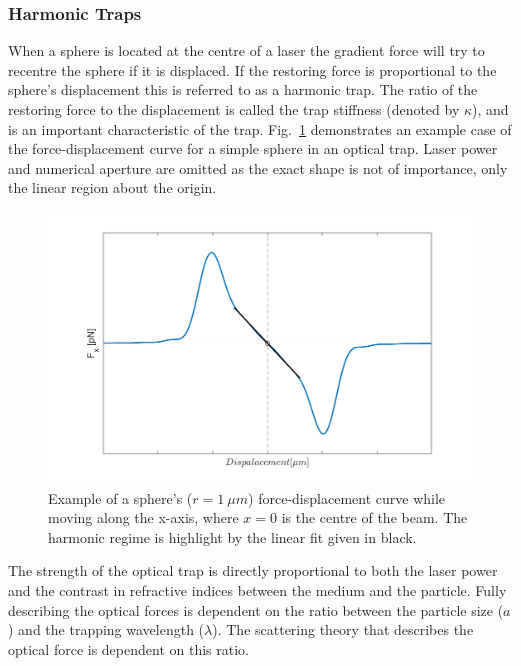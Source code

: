 \subsubsection{Harmonic Traps}
\label{sec:harmonic_traps}
When a sphere is located at the centre of a laser the gradient 
force will try to recentre the sphere if it is displaced. If 
the restoring force is proportional to the sphere's displacement 
this is referred to as a harmonic trap. The ratio of the restoring 
force to the displacement is called the trap stiffness (denoted 
by $\kappa$), and is an important characteristic of the trap. Fig.~\ref{fig:harmonic_trap} demonstrates an example case of the
force-displacement curve for a simple sphere in an optical trap. 
Laser power and numerical aperture are omitted as the exact shape 
is not of importance, only the linear region about the origin.
\begin{figure}[h!]
	\centering
	\includegraphics[width=1.1\linewidth]{sphere_force_curve.png}
	\caption{Example of a sphere's ($r=1\ \mu m$) force-displacement
		curve while moving along the x-axis, where $x=0$ is the 
		centre of the beam. The harmonic regime is highlight by the 
		linear fit given in black.}
	\label{fig:harmonic_trap}
\end{figure}

The strength of the optical trap is directly proportional to 
both the laser power and the contrast in refractive indices 
between the medium and the particle. Fully describing the 
optical forces is dependent on the ratio between the particle 
size ($a$) and the trapping wavelength ($\lambda$). The 
scattering theory that describes the optical force is dependent 
on this ratio.  

